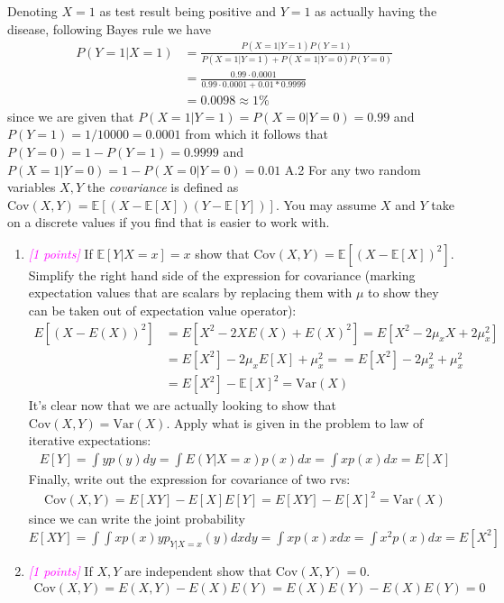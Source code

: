\documentclass{article}
\newcommand{\1}{\mathbf{1}}
\newcommand{\E}{\mathbb{E}}
\newcommand{\points}[1]{\small\textcolor{magenta}{\emph{[#1 points]}} \normalsize}
\begin{document}
Denoting $X=1$ as test result being positive and $Y=1$ as actually having the disease, following Bayes rule we have
\begin{align*}
    P(Y=1|X=1) &= \frac{P(X=1|Y=1)P(Y=1)}{P(X=1|Y=1)+P(X=1|Y=0)P(Y=0)} \\
    &= \frac{0.99\cdot0.0001}{0.99\cdot0.0001 + 0.01*0.9999} \\
    &= 0.0098 \approx 1\%
\end{align*}
since we are given that $P(X=1|Y=1)=P(X=0|Y=0)=0.99$ and $P(Y=1)=1/10000=0.0001$ from which it follows that $P(Y=0)=1-P(Y=1)=0.9999$ and $P(X=1|Y=0)=1-P(X=0|Y=0)=0.01$
\newline
\newline
A.2 For any two random variables $X,Y$ the \emph{covariance} is defined as $\text{Cov}(X,Y)=\E[(X-\E[X])(Y-\E[Y])]$. You may assume $X$ and $Y$ take on a discrete values if you find that is easier to work with.
    \begin{enumerate}
         \item \points{1} If $\E[Y|X=x] = x$ show that $\text{Cov}(X,Y) = \E[(X-\E[X])^2]$. 
         Simplify the right hand side of the expression for covariance (marking expectation values that are scalars by replacing them with $\mu$ to show they can be taken out of expectation value operator):
             \begin{align*}
                 E[(X-E(X))^2] &= E[ X^2 - 2XE(X) + E(X)^2 ] = E[X^2 - 2\mu_xX + 2\mu_x^2] \\
                 &=E[X^2] - 2\mu_xE[X] + \mu_x^2 = =E[X^2] - 2\mu_x^2 + \mu_x^2 \\
                 &=E[X^2]-\E[X]^2 = \text{Var}(X)
             \end{align*}
         It's clear now that we are actually looking to show that $\text{Cov}(X,Y)=\text{Var}(X)$. Apply what is given in the problem to law of iterative expectations: 
             \begin{align*}
                 E[Y] = \int yp(y)dy = \int E(Y|X=x)p(x) dx = \int xp(x)dx = E[X]
             \end{align*}
         Finally, write out the expression for covariance of two rvs:
             \begin{align*}
                 \text{Cov}(X,Y) = E[XY] - E[X]E[Y] = E[XY] - E[X]^2 = \text{Var}(X)
             \end{align*}
         since we can write the joint probability $E[XY]=\int\int xp(x)yp_{Y|X=x}(y)dxdy = \int xp(x)x dx = \int x^2p(x)dx = E[X^2]$
         \item \points{1} If $X,Y$ are independent show that $\text{Cov}(X,Y)=0$.
             \begin{align*}
                 \text{Cov}(X,Y) = E(X,Y) - E(X)E(Y) = E(X)E(Y) - E(X)E(Y) = 0
             \end{align*}
\end{enumerate}
\end{document}
